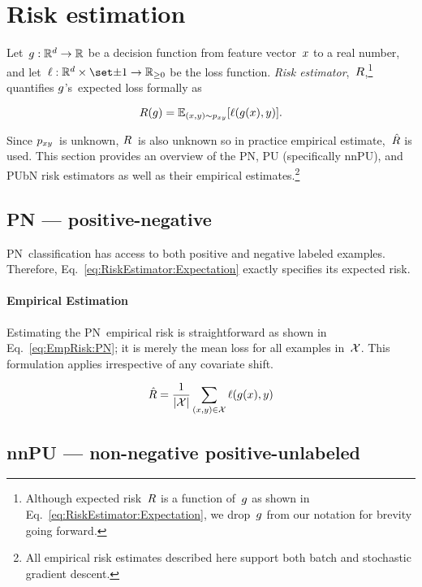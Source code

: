 \section{Risk estimation}\label{sec:RiskEstimators}

Let~${g:\mathbb{R}^{d}\rightarrow\mathbb{R}}$ be a decision function from feature vector~$x$ to a real number, and let~$\func{\loss}{\domainX \times \domainY}{\real_{{\geq}0}}$ be the loss function.  \textit{Risk estimator},~$R$,\footnote{Although expected risk~$R$ is a function of~$g$ as shown in Eq.~\eqref{eq:RiskEstimator:Expectation}, we drop~$g$ from our notation for brevity going forward.} quantifies $g$'s~expected loss formally as

\begin{equation}\label{eq:RiskEstimator:Expectation}
  R(g) = \mathbb{E}_{(x,y) \sim p_{xy}}\lbrack\ell\mathopen{}\left(g\mathopen{}\left(x\right)\mathclose{},y\right)\mathclose{}\rbrack\text{.}
\end{equation}

Since $p_{xy}$~is unknown, $R$~is also unknown so in practice empirical estimate,~$\hat{R}$ is used.  This section provides an overview of the PN, PU (specifically nnPU), and PUbN risk estimators as well as their empirical estimates.\footnote{All empirical risk estimates described here support both batch and stochastic gradient descent.}

\subsection{PN --- positive-negative}

PN~classification has access to both positive and negative labeled examples.  Therefore, Eq.~\eqref{eq:RiskEstimator:Expectation} exactly specifies its expected risk.

\paragraph{Empirical Estimation} Estimating the PN~empirical risk is straightforward as shown in Eq.~\eqref{eq:EmpRisk:PN}; it is merely the mean loss for all examples in~$\mathcal{X}$.  This formulation applies irrespective of any covariate shift.

\begin{equation}\label{eq:EmpRisk:PN}
  \hat{R} = \frac{1}{\lvert\mathcal{X}\rvert} \sum_{(x,y) \in \mathcal{X}} \ell\mathopen{}\left(g\mathopen{}\left(x\right)\mathclose{},y\right)\mathclose{}
\end{equation}

\subsection{nnPU --- non-negative positive-unlabeled}

